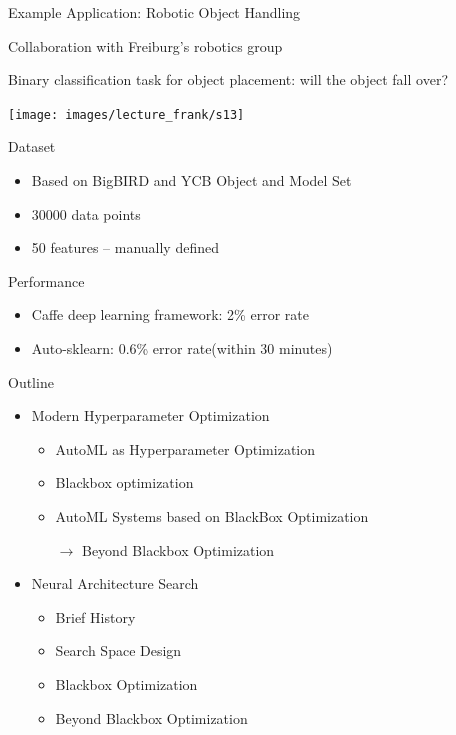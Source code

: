\begin{frame}[c]{Example Application: Robotic Object Handling}
\begin{itemize}
	\begin{minipage}{0.325\textwidth}
		\item Collaboration with Freiburg’s robotics group
		\item Binary classification task for object placement: \alert{will the object fall over?}
	\end{minipage}
	\begin{minipage}{0.575\textwidth}
		{\centering
			\texttt{[image: images/lecture\_frank/s13]}
		}
	\end{minipage}
	\item Dataset
	\begin{itemize}
		\item Based on BigBIRD and YCB Object and Model Set
		\item 30000 data points
		\item 50 features -- manually defined 
	\end{itemize}
	\item Performance
	\begin{itemize}
		\item \alert{Caffe deep learning framework: 2\% error rate}
		\item \alert{Auto-sklearn: 0.6\% error rate}(within 30 minutes)
	\end{itemize}
\end{itemize}
\end{frame}
\begin{frame}[c]{Outline}
\begin{itemize}
	\item Modern Hyperparameter Optimization
	\begin{itemize}
		\item AutoML as Hyperparameter Optimization
		\item Blackbox optimization
		\item AutoML Systems based on BlackBox Optimization
		\item[$\to$] Beyond Blackbox Optimization 
	\end{itemize}
	\item Neural Architecture Search
	\begin{itemize}
		\item Brief History
		\item Search Space Design
		\item Blackbox Optimization
		\item Beyond Blackbox Optimization
	\end{itemize}
\end{itemize}
\end{frame}
